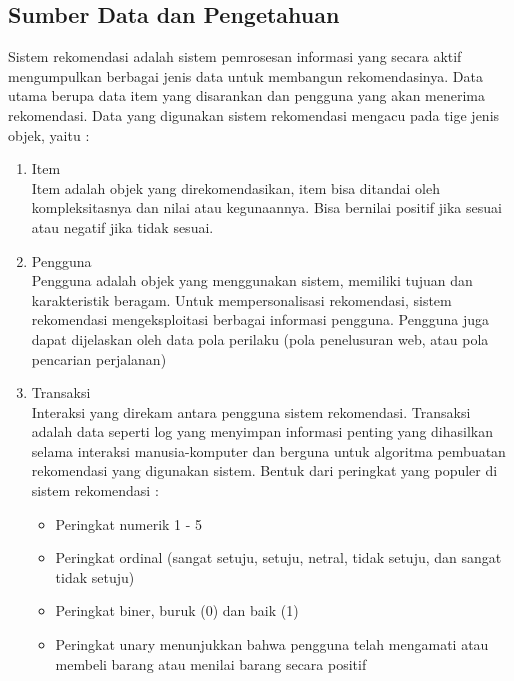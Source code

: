 \subsection{Sumber Data dan Pengetahuan}
\label{sec:sumber data dan pengetahuan}
Sistem rekomendasi adalah sistem pemrosesan informasi yang secara aktif mengumpulkan berbagai jenis data untuk membangun rekomendasinya. Data utama berupa data item yang disarankan dan pengguna yang akan menerima rekomendasi. Data yang digunakan sistem rekomendasi mengacu pada tige jenis objek, yaitu : %
	\begin{enumerate}
	\item Item\\
		Item adalah objek yang direkomendasikan, item bisa ditandai oleh kompleksitasnya dan nilai atau kegunaannya. Bisa bernilai positif jika sesuai atau negatif jika tidak sesuai.
	
	\item Pengguna\\
		Pengguna adalah objek yang menggunakan sistem, memiliki tujuan dan karakteristik beragam. Untuk mempersonalisasi rekomendasi, sistem rekomendasi mengeksploitasi berbagai informasi pengguna. Pengguna juga dapat dijelaskan oleh data pola perilaku (pola penelusuran web, atau pola pencarian perjalanan)
	
	\item Transaksi\\
		Interaksi yang direkam antara pengguna sistem rekomendasi. Transaksi adalah data seperti log yang menyimpan informasi penting yang dihasilkan selama interaksi manusia-komputer dan berguna untuk algoritma pembuatan rekomendasi yang digunakan sistem. Bentuk dari peringkat yang populer di sistem rekomendasi :
		
		\begin{itemize}
			\item Peringkat numerik 1 - 5
		
			\item Peringkat ordinal (sangat setuju, setuju, netral, tidak setuju, dan sangat tidak setuju)
		
			\item Peringkat biner, buruk (0) dan baik (1)
		
			\item Peringkat unary menunjukkan bahwa pengguna telah mengamati atau membeli barang atau menilai barang secara positif
		\end{itemize}
		
	\end{enumerate}
	
